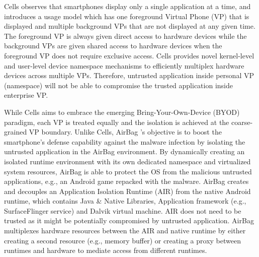 Cells observes that smartphones display only a single application at a time,
and introduces a usage model which has one foreground Virtual Phone (VP) that
is displayed and multiple background VPs that are not displayed at any given
time. The foreground VP is always given direct access to hardware devices while
the background VPs are given shared access to hardware devices when the
foreground VP does not require exclusive access. Cells provides novel
kernel-level and user-level device namespace mechanisms to efficiently
multiplex hardware devices across multiple VPs. Therefore, untrusted
application inside personal VP (namespace) will not be able to compromise the
trusted application inside enterprise VP.

While Cells aims to embrace the emerging Bring-Your-Own-Device (BYOD) paradigm,
each VP is treated equally and the isolation is achieved at the coarse-grained
VP boundary. Unlike Cells, AirBag \cite{AirBag}'s objective is to boost the
smartphone's defense capability against the malware infection by isolating the
untrusted application in the AirBag environment. By dynamically creating an
isolated runtime environment with its own dedicated namespace and virtualized
system resources, AirBag is able to protect the OS from the malicious untrusted
applications, e.g., an Android game repacked with the malware. AirBag creates
and decouples an Application Isolation Runtime (AIR) from the native Android
runtime, which contains Java \& Native Libraries, Application framework (e.g.,
SurfaceFlinger service) and Dalvik virtual machine.  AIR does not need to be
trusted as it might be potentially compromised by untrusted application. AirBag
multiplexes hardware resources between the AIR and native runtime by either
creating a second resource (e.g., memory buffer) or creating a proxy between
runtimes and hardware to mediate access from different runtimes. 


